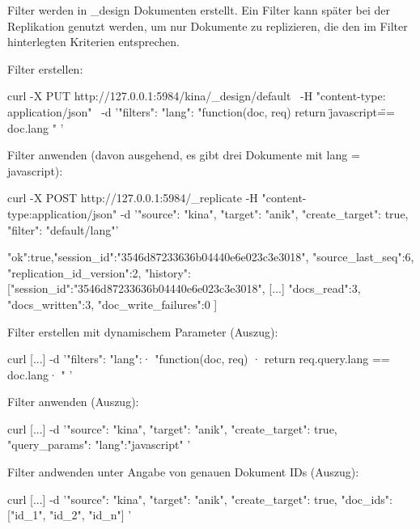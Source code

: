 \documentclass[19pt,landscape,twocolumn]{article}
\newcommand{\setparskip}{\setlength{\parskip}{-6mm}}
\newcommand{\resetparskip}{\setlength{\parskip}{1mm}}
\begin{document}
Filter werden in \_design Dokumenten erstellt. Ein Filter kann später bei der Replikation genutzt werden, um nur
Dokumente zu replizieren, die den im Filter hinterlegten Kriterien entsprechen.

Filter erstellen:

\begin{code}
curl -X PUT http://127.0.0.1:5984/kina/_design/default \
  -H "content-type: application/json" \
  -d '{"filters":{
        "lang":
          "function(doc, req) {
            return \"javascript\" == doc.lang 
          }"
        }
     }'
\end{code}

Filter anwenden (davon ausgehend, es gibt drei Dokumente mit lang = javascript):

\begin{code}
curl -X POST http://127.0.0.1:5984/_replicate
     -H "content-type:application/json"
     -d '{"source": "kina",
          "target": "anik",
          "create_target": true,
          "filter": "default/lang"}'
\end{code}
\setparskip
\begin{response}
{"ok":true,"session_id":"3546d87233636b04440e6e023c3e3018",
 "source_last_seq":6,
 "replication_id_version":2, "history":
  [{"session_id":"3546d87233636b04440e6e023c3e3018",
    [...]
    "docs_read":3,
    "docs_written":3,
    "doc_write_failures":0
  }]
}
\end{response}
\resetparskip

Filter erstellen mit dynamischem Parameter (Auszug):

\begin{code}
curl [...]
  -d '{"filters":{
       "lang":·
         "function(doc, req) {·
           return req.query.lang == doc.lang·
         }"
       }
    }'
\end{code}

Filter anwenden (Auszug):

\begin{code}
curl [...]
  -d '{"source": "kina",
       "target": "anik",
       "create_target": true,
       "query_params": {
          "lang":"javascript"
       }
     }'
\end{code}

Filter andwenden unter Angabe von genauen Dokument IDs (Auszug):

\begin{code}
curl [...]
  -d '{"source": "kina",
       "target": "anik",
       "create_target": true,
       "doc_ids": ["id_1", "id_2", "id_n"]
     }'
\end{code}
\end{document}
